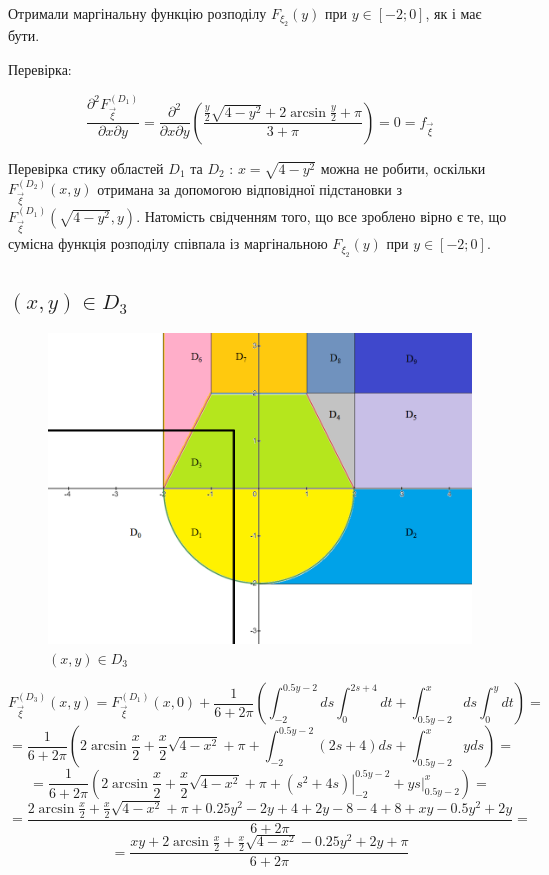 \documentclass[14pt, a4paper, ukrainian]{extreport}
\begin{document}
	Отримали маргінальну функцію розподілу $ F_{\xi_2} (y) $ при $y \in [-2; 0]$, як і має бути.
	
	Перевірка:
	
	$$\frac{\partial^2F_{\vec\xi}^{\left(D_1\right)}}{\partial x \partial y} = \frac{\partial^2}{\partial x \partial y}\left(\dfrac{\frac{y}{2}\sqrt{4-y^2} + 2\arcsin\frac{y}{2} + \pi}{3+\pi} \right) = 0 = f_{\vec\xi}
	$$
	
	Перевірка стику областей $D_1$ та $D_2$ : $ x = \sqrt{4-y^2}$ можна не робити, оскільки $F_{\vec \xi}^{\left(D_2\right)}(x, y)$ отримана за допомогою відповідної підстановки з \\
	$F_{\vec \xi}^{\left(D_1\right)}(\sqrt{4-y^2}, y)$. Натомість свідченням того, що все зроблено вірно є те, що сумісна функція розподілу співпала із маргінальною $ F_{\xi_2} (y) $ при $y \in [-2; 0]$.
	
	\subsection{$(x, y) \in D_3 $}
	
	\begin{figure}[H]
		\centering
		\includegraphics[width=\textwidth]{./Image/Im_14_D_3.png}
		\caption{$(x, y) \in D_3 $}
		\label{im:D_3}
	\end{figure}
	
	$$ F_{\vec \xi}^{\left(D_3\right)}(x, y) = F_{\vec \xi}^{\left(D_1\right)}(x, 0) + \frac{1}{6+2\pi}\left(\int_{-2}^{0.5y-2}ds\int_{0}^{2s+4}dt +  \int_{0.5y-2}^{x}ds\int_{0}^{y}dt\right)= 
	$$
	$$ = \frac{1}{6+2\pi}\left(2\arcsin\frac{x}{2} + \frac{x}{2}\sqrt{4-x^2} + \pi + \int_{-2}^{0.5y-2}(2s+4)ds + \int_{0.5y-2}^{x}yds\right) = 
	$$
	$$ = \frac{1}{6+2\pi}\left(2\arcsin\frac{x}{2} + \frac{x}{2}\sqrt{4-x^2} + \pi + \left.\left(s^2 + 4s\right)\right|_{-2}^{0.5y-2} +  \left.ys\right|_{0.5y-2}^x\right) = 
	$$
	$$ = \frac{2\arcsin\frac{x}{2} + \frac{x}{2}\sqrt{4-x^2} + \pi + 0.25y^2 - 2 y + 4 + 2y - 8 - 4 + 8 + xy - 0.5y^2 + 2y}{6+2\pi} = 
	$$
	$$ = \frac{xy + 2\arcsin\frac{x}{2} + \frac{x}{2}\sqrt{4-x^2} - 0.25y^2 + 2y + \pi}{6+2\pi}
	$$
	
\end{document}
